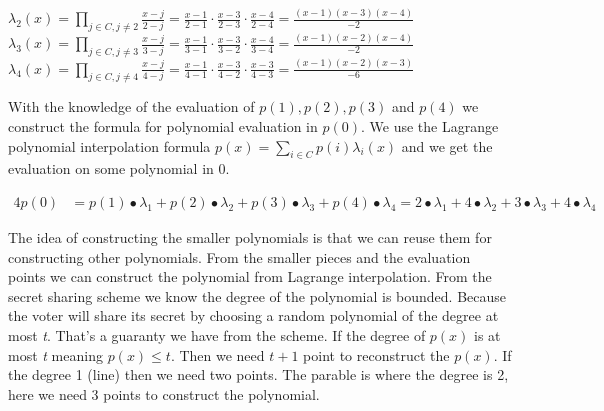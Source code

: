 \begin{center}
\begin{math} \lambda_2(x)=\prod\limits_{j\in C,j\neq2} \frac{x-j}{2-j} = \frac{x-1}{2-1} \cdot \frac{x-3}{2-3} \cdot \frac{x-4}{2-4}=\frac{(x-1)(x-3)(x-4)}{-2} \end{math}\\ 

\begin{math} \lambda_3(x)=\prod\limits_{j\in C,j\neq3} \frac{x-j}{3-j} = \frac{x-1}{3-1} \cdot \frac{x-3}{3-2} \cdot \frac{x-4}{3-4}=\frac{(x-1)(x-2)(x-4)}{-2} \end{math}\\ 

\begin{math} \lambda_4(x)=\prod\limits_{j\in C,j\neq4} \frac{x-j}{4-j} = \frac{x-1}{4-1} \cdot \frac{x-3}{4-2} \cdot \frac{x-3}{4-3}=\frac{(x-1)(x-2)(x-3)}{-6} \end{math}\\ 
\end{center}

\noindent
With the knowledge of the evaluation of \begin{math}p(1), p(2), p(3)\end{math} and  \begin{math}p(4)\end{math} we construct the formula for polynomial evaluation in \begin{math}p(0)\end{math}. We use the Lagrange polynomial interpolation formula \begin{math}p(x)=\sum\limits_{i \in C} p(i)\lambda_i(x)\end{math} and we get the evaluation on some polynomial in $0$.


\noindent
\begin{alignat*}{4}
p(0) &=p(1)∙\lambda_1+p(2)∙\lambda_2+p(3)∙\lambda_3+p(4)∙\lambda_4=2∙\lambda_1+4∙\lambda_2+3∙\lambda_3+4∙\lambda_4  
\end{alignat*}



\noindent
The idea of constructing the smaller polynomials is that we can reuse them for constructing other polynomials. From the smaller pieces and the evaluation points we can construct the polynomial from Lagrange interpolation. From the secret sharing scheme we know the degree of the polynomial is bounded. Because the voter will share its secret by choosing a random polynomial of the degree at most \textit{t}. That’s a guaranty we have from the scheme. If the degree of $p(x)$ is at most \textit{t} meaning $p(x)\leq t$. Then we need $t+1$ point to reconstruct the $p(x)$. If the degree 1 (line) then we need two points. The parable is where the degree is 2, here we need 3 points to construct
the polynomial.

